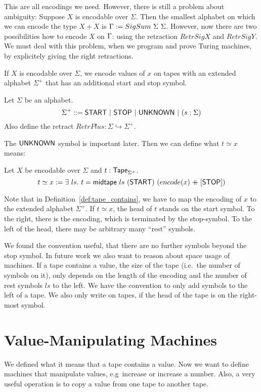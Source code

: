 This are all encodings we need.  However, there is still a problem about ambiguity: Suppose $X$ is encodable over $\Sigma$.  Then the smallest
alphabet on which we can encode the type $X+X$ is $\Gamma := SigSum~\Sigma~\Sigma$.  However, now there are two possibilities how to encode $X$ on
$\Gamma$: using the retraction $RetrSigX$ and $RetrSigY$.  We must deal with this problem, when we program and prove Turing machines, by explicitely
giving the right retractions.

If $X$ is encodable over $\Sigma$, we encode values of $x$ on tapes with an extended alphabet $\Sigma^+$ that has an additional start and stop symbol.
\begin{definition}[$\Sigma^+$] Let $\Sigma$ be an alphabet.
  \[
    \Sigma^+ ::= \textsf{START} ~|~ \textsf{STOP} ~|~ \textsf{UNKNOWN} ~|~ (s: \Sigma)
  \]
  Also define the retract $RetrPlus : \Sigma \hookrightarrow \Sigma^+$.
\end{definition}
The $\textsf{UNKNOWN}$ symbol is important later. Then we can define what $t \simeq x$ means:
\begin{definition}[$t \simeq x$]
  \label{def:tape_contains}
  Let $X$ be encodable over $\Sigma$ and $t : \textsf{Tape}_{\Sigma^+}$.
  \[
    t \simeq x := \exists~ls.~
    t = \textsf{midtape}~ls~(\textsf{START})~(encode(x) \mathbin{+\mkern-10mu+} [\textsf{STOP}])
  \]
\end{definition}

Note that in Definition~\ref{def:tape_contains}, we have to map the encoding of $x$ to the extended alphabet $\Sigma^+$.  If $t \simeq x$, the head of
$t$ stands on the start symbol.  To the right, there is the encoding, which is terminated by the stop-symbol.  To the left of the head, there may be
arbitrary many ``rest'' symbols.

We found the convention useful, that there are no further symbols beyond the stop symbol.  In future work we also want to reason about space usage of
machines.  If a tape contains a value, the size of the tape (i.e.\ the number of symbols on it), only depends on the length of the encoding and the
number of rest symbols $ls$ to the left.  We have the convention to only add symbols to the left of a tape.  We also only write on tapes, if the head
of the tape is on the right-most symbol.

\section{Value-Manipulating Machines}
\label{sec:value-manipulate}


We defined what it means that a tape contains a value.  Now we want to define machines that manipulate values, e.g\ increase or increase a number.
Also, a very useful operation is to copy a value from one tape to another tape.


\todo{}







